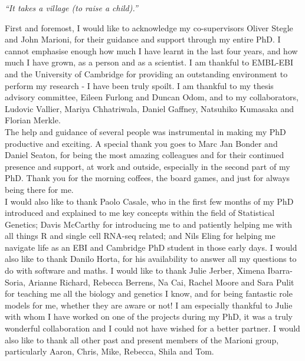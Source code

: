 
\begin{acknowledgements}      

\textit{“It takes a village (to raise a child).”}\\

\vspace{5mm}

First and foremost, I would like to acknowledge my co-supervisors Oliver Stegle and John Marioni, for their guidance and support through my entire PhD.
I cannot emphasise enough how much I have learnt in the last four years, and how much I have grown, as a person and as a scientist.
I am thankful to EMBL-EBI and the University of Cambridge for providing an outstanding environment to perform my research - I have been truly spoilt.
I am thankful to my thesis advisory committee, Eileen Furlong and Duncan Odom, and to my collaborators, Ludovic Vallier, Mariya Chhatriwala, Daniel Gaffney, Natsuhiko Kumasaka and Florian Merkle. \\

The help and guidance of several people was instrumental in making my PhD productive and exciting.
A special thank you goes to Marc Jan Bonder and Daniel Seaton, for being the most amazing colleagues and for their continued presence and support, at work and outside, especially in the second part of my PhD. 
Thank you for the morning coffees, the board games, and just for always being there for me. \\

I would also like to thank Paolo Casale, who in the first few months of my PhD introduced and explained to me key concepts within the field of Statistical Genetics; Davis McCarthy for introducing me to and patiently helping me with all things R and single cell RNA-seq related; and Nils Eling for helping me navigate life as an EBI and Cambridge PhD student in those early days.
I would also like to thank Danilo Horta, for his availability to answer all my questions to do with software and maths.
I would like to thank Julie Jerber, Ximena Ibarra-Soria, Arianne Richard, Rebecca Berrens, Na Cai, Rachel Moore and Sara Pulit for teaching me all the biology and genetics I know, and for being fantastic role models for me, whether they are aware or not!
I am especially thankful to Julie with whom I have worked on one of the projects during my PhD, it was a truly wonderful collaboration and I could not have wished for a better partner.
I would also like to thank all other past and present members of the Marioni group, particularly Aaron, Chris, Mike, Rebecca, Shila and Tom. \\


\end{acknowledgements}
